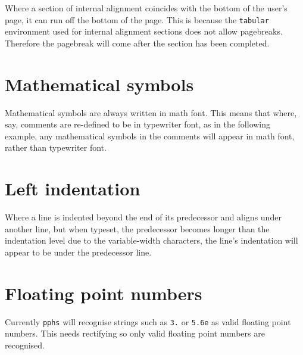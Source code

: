 Where a section of internal alignment coincides with the bottom of the user's page,
it can run off the bottom of the page.  This is because the {\tt tabular} environment
used for internal alignment sections does not allow pagebreaks.  Therefore the pagebreak
will come after the section has been completed.

\section{Mathematical symbols}

Mathematical symbols are always written in math font.  This means that where, say,
comments are re-defined to be in typewriter font, as in the following
example, any mathematical symbols in the comments
will appear in math font, rather than typewriter font.
\begin{quote}
\def\com{\tt}

\end{quote}

\section{Left indentation}

Where a line is indented beyond the end of its predecessor and aligns under another
line, but when typeset, the predecessor becomes longer than the indentation level
due to the variable-width characters,  the line's indentation will appear to be under the
predecessor line.

\section{Floating point numbers}

Currently {\tt pphs} will recognise strings such as {\tt 3.} or {\tt 5.6e} as
valid floating point numbers.  This needs rectifying so only valid floating
point numbers are recognised.